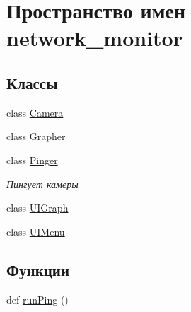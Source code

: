 \hypertarget{namespacenetwork__monitor}{}\section{Пространство имен network\+\_\+monitor}
\label{namespacenetwork__monitor}
\subsection*{Классы}
\begin{DoxyCompactItemize}
\item 
class \hyperlink{classnetwork__monitor_1_1_camera}{Camera}
\item 
class \hyperlink{classnetwork__monitor_1_1_grapher}{Grapher}
\item 
class \hyperlink{classnetwork__monitor_1_1_pinger}{Pinger}
\begin{DoxyCompactList}\small\item\em Пингует камеры \end{DoxyCompactList}\item 
class \hyperlink{classnetwork__monitor_1_1_u_i_graph}{U\+I\+Graph}
\item 
class \hyperlink{classnetwork__monitor_1_1_u_i_menu}{U\+I\+Menu}
\end{DoxyCompactItemize}
\subsection*{Функции}
\begin{DoxyCompactItemize}
\item 
def \hyperlink{namespacenetwork__monitor_aa615228bd6f33e03eb168421f8980368}{run\+Ping} ()
\end{DoxyCompactItemize}
